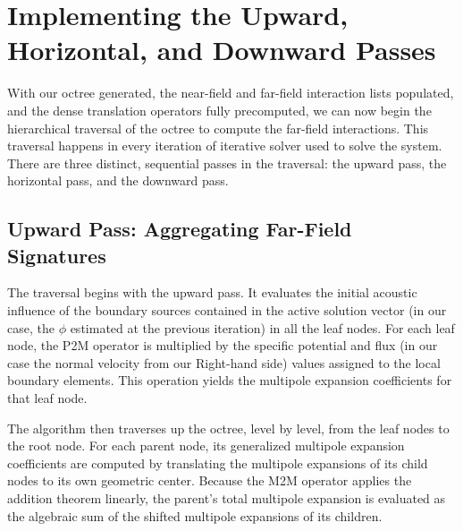 \section{Implementing the Upward, Horizontal, and Downward Passes}
\label{sec:translation-passes}

With our octree generated, the near-field and far-field interaction lists populated, and the dense translation operators fully precomputed, we can now begin the hierarchical traversal of the octree to compute the far-field interactions. 
This traversal happens in every iteration of iterative solver used to solve the system.
There are three distinct, sequential passes in the traversal: the upward pass, the horizontal pass, and the downward pass.

\subsection{Upward Pass: Aggregating Far-Field Signatures} \label{upward-pass}
The traversal begins with the upward pass. It evaluates the initial acoustic influence of the boundary sources contained in the active solution vector (in our case, the $\phi$ estimated at the previous iteration) in all the leaf nodes. For each leaf node, the \ac{P2M} operator is multiplied by the specific potential and flux (in our case the normal velocity from our Right-hand side) values assigned to the local boundary elements. This operation yields the multipole expansion coefficients for that leaf node.

The algorithm then traverses up the octree, level by level, from the leaf nodes to the root node. For each parent node, its generalized multipole expansion coefficients are computed by translating the multipole expansions of its child nodes to its own geometric center. Because the \ac{M2M} operator applies the addition theorem linearly, the parent's total multipole expansion is evaluated as the algebraic sum of the shifted multipole expansions of its children.


